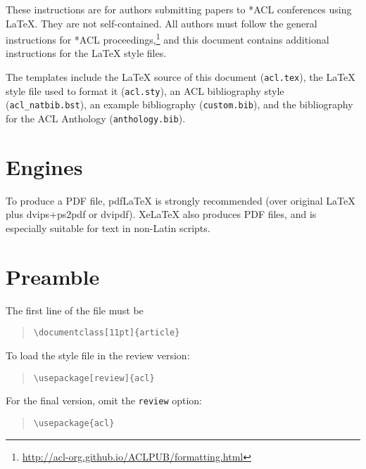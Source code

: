 \documentclass[11pt]{article}
\begin{document}
\citep{bybee1983}

\citep{tenenbaum1999} %

\citep{plotkin1970} %


\vfill
\pagebreak

These instructions are for authors submitting papers to *ACL conferences using \LaTeX. They are not self-contained. All authors must follow the general instructions for *ACL proceedings,\footnote{\url{http://acl-org.github.io/ACLPUB/formatting.html}} and this document contains additional instructions for the \LaTeX{} style files.

The templates include the \LaTeX{} source of this document (\texttt{acl.tex}),
the \LaTeX{} style file used to format it (\texttt{acl.sty}),
an ACL bibliography style (\texttt{acl\_natbib.bst}),
an example bibliography (\texttt{custom.bib}),
and the bibliography for the ACL Anthology (\texttt{anthology.bib}).

\section{Engines}

To produce a PDF file, pdf\LaTeX{} is strongly recommended (over original \LaTeX{} plus dvips+ps2pdf or dvipdf). Xe\LaTeX{} also produces PDF files, and is especially suitable for text in non-Latin scripts.

\section{Preamble}

The first line of the file must be
\begin{quote}
\begin{verbatim}
\documentclass[11pt]{article}
\end{verbatim}
\end{quote}

To load the style file in the review version:
\begin{quote}
\begin{verbatim}
\usepackage[review]{acl}
\end{verbatim}
\end{quote}
For the final version, omit the \verb|review| option:
\begin{quote}
\begin{verbatim}
\usepackage{acl}
\end{verbatim}
\end{quote}
\end{document}
